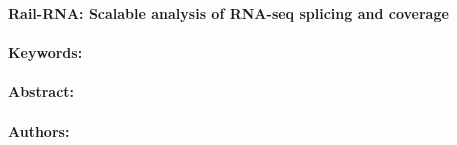\noindent
\large {\bf Rail-RNA: Scalable analysis of RNA-seq splicing and coverage} 


\normalsize 


\noindent \paragraph{Keywords:} 

\noindent \paragraph{Abstract:} 



\noindent \paragraph{Authors:} 

